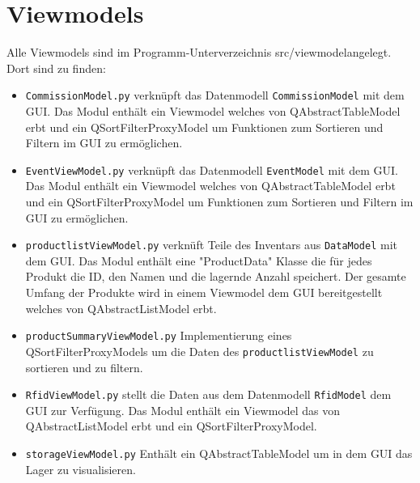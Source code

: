 \section{Viewmodels}
Alle Viewmodels sind im Programm-Unterverzeichnis \glqq src/viewmodel\grqq angelegt. Dort sind zu finden: 
\begin{itemize}
    \item \verb|CommissionModel.py| verknüpft das Datenmodell \verb|CommissionModel| mit dem GUI. Das Modul enthält ein Viewmodel welches von QAbstractTableModel erbt und ein QSortFilterProxyModel um Funktionen zum Sortieren und Filtern im GUI zu ermöglichen.
    \item \verb|EventViewModel.py| verknüpft das Datenmodell \verb|EventModel| mit dem GUI. Das Modul enthält ein Viewmodel welches von QAbstractTableModel erbt und ein QSortFilterProxyModel um Funktionen zum Sortieren und Filtern im GUI zu ermöglichen.
    \item \verb|productlistViewModel.py| verknüft Teile des Inventars aus \verb|DataModel| mit dem GUI. Das Modul enthält eine "ProductData" Klasse die für jedes Produkt die ID, den Namen und die lagernde Anzahl speichert. Der gesamte Umfang der Produkte wird in einem Viewmodel dem GUI bereitgestellt welches von QAbstractListModel erbt. 
    \item \verb|productSummaryViewModel.py| Implementierung eines QSortFilterProxyModels um die Daten des \verb|productlistViewModel| zu sortieren und zu filtern.
    \item \verb|RfidViewModel.py| stellt die Daten aus dem Datenmodell \verb|RfidModel| dem GUI zur Verfügung. Das Modul enthält ein Viewmodel das von QAbstractListModel erbt und ein QSortFilterProxyModel.
    \item \verb|storageViewModel.py| Enthält ein QAbstractTableModel um in dem GUI das Lager zu visualisieren. 
\end{itemize}

